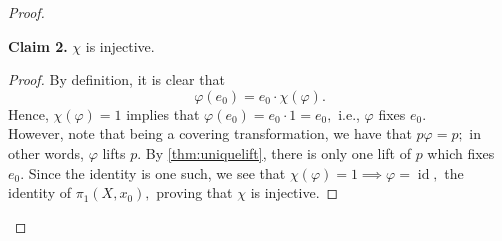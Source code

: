 \documentclass[12pt]{article}
\theoremstyle{definition}
\numberwithin{thm}{section}
\newcommand{\id}{\operatorname{id}}
\newenvironment{blockquote}
{\begin{mdframed}[skipabove=0pt, skipbelow=0pt, innertopmargin=4pt, innerbottommargin=4pt, bottomline=false,topline=false,rightline=false, linewidth=2pt]}
{\end{mdframed}}
\begin{document}
\begin{proof}
	\begin{blockquote}
		\textbf{Claim 2.} $\chi$ is injective.
		\begin{proof} 
			By definition, it is clear that 
			\begin{equation*} 
				\varphi(e_0) = e_0\cdot\chi(\varphi).
			\end{equation*}
			Hence, $\chi(\varphi) = 1$ implies that $\varphi(e_0) = e_0\cdot1 = e_0,$ i.e., $\varphi$ fixes $e_0.$\\
			However, note that being a covering transformation, we have that $p\varphi = p;$ in other words, $\varphi$ lifts $p.$ By \ref{thm:uniquelift}, there is only one lift of $p$ which fixes $e_0.$ Since the identity is one such, we see that $\chi(\varphi) = 1 \implies \varphi = \id,$ the identity of $\pi_1(X, x_0),$ proving that $\chi$ is injective. 
		\end{proof}
	\end{blockquote}


\end{proof}
\end{document}

